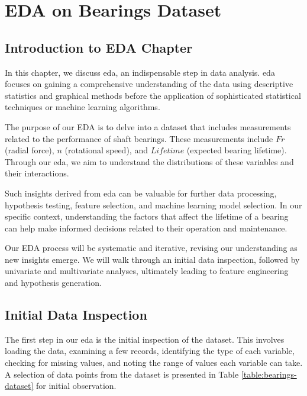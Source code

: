 \chapter{EDA on Bearings Dataset}
\label{sec:bearings-eda}


\section{Introduction to EDA Chapter}

In this chapter, we discuss \ac{eda}, an indispensable step in data analysis. \ac{eda} focuses on gaining a comprehensive understanding of the data using descriptive statistics and graphical methods before the application of sophisticated statistical techniques or machine learning algorithms.

The purpose of our EDA is to delve into a dataset that includes measurements related to the performance of shaft bearings. These measurements include $Fr$ (radial force), $n$ (rotational speed), and $Lifetime$ (expected bearing lifetime). Through our \ac{eda}, we aim to understand the distributions of these variables and their interactions.

Such insights derived from \ac{eda} can be valuable for further data processing, hypothesis testing, feature selection, and machine learning model selection. In our specific context, understanding the factors that affect the lifetime of a bearing can help make informed decisions related to their operation and maintenance.

Our EDA process will be systematic and iterative, revising our understanding as new insights emerge. We will walk through an initial data inspection, followed by univariate and multivariate analyses, ultimately leading to feature engineering and hypothesis generation.


\section{Initial Data Inspection}

The first step in our \ac{eda} is the initial inspection of the dataset. This involves loading the data, examining a few records, identifying the type of each variable, checking for missing values, and noting the range of values each variable can take. A selection of data points from the dataset is presented in Table \ref{table:bearings-dataset} for initial observation.

